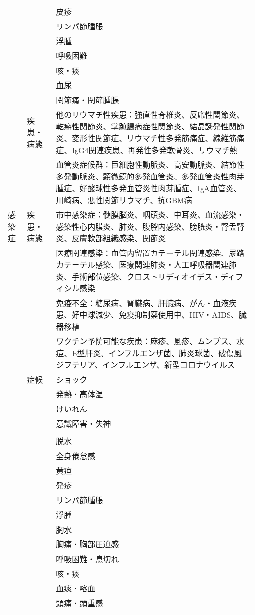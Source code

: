 \begin{xltabular}{\linewidth}{XXX}
 &  & 皮疹 \\
 &  & リンパ節腫脹 \\
 &  & 浮腫 \\
 &  & 呼吸困難 \\
 &  & 咳・痰 \\
 &  & 血尿 \\
 &  & 関節痛・関節腫脹 \\
 & 疾患・病態 & 他のリウマチ性疾患：強直性脊椎炎、反応性関節炎、乾癬性関節炎、掌蹠膿疱症性関節炎、結晶誘発性関節炎、変形性関節症、リウマチ性多発筋痛症、線維筋痛症、IgG4関連疾患、再発性多発軟骨炎、リウマチ熱 \\
 &  & 血管炎症候群：巨細胞性動脈炎、高安動脈炎、結節性多発動脈炎、顕微鏡的多発血管炎、多発血管炎性肉芽腫症、好酸球性多発血管炎性肉芽腫症、IgA血管炎、川崎病、悪性関節リウマチ、抗GBM病 \\
感染症 & 疾患・病態 & 市中感染症：髄膜脳炎、咽頭炎、中耳炎、血流感染・感染性心内膜炎、肺炎、腹腔内感染、膀胱炎・腎盂腎炎、皮膚軟部組織感染、関節炎 \\
 &  & 医療関連感染：血管内留置カテーテル関連感染、尿路カテーテル感染、医療関連肺炎・人工呼吸器関連肺炎、手術部位感染、クロストリディオイデス・ディフィシル感染 \\
 &  & 免疫不全：糖尿病、腎臓病、肝臓病、がん・血液疾患、好中球減少、免疫抑制薬使用中、HIV・AIDS、臓器移植 \\
 &  & ワクチン予防可能な疾患：麻疹、風疹、ムンプス、水痘、B型肝炎、インフルエンザ菌、肺炎球菌、破傷風ジフテリア、インフルエンザ、新型コロナウイルス \\
 & 症候 & ショック \\
 &  & 発熱・高体温 \\
 &  & けいれん \\
 &  & 意識障害・失神 \\
 &  &  \\
 &  & 脱水 \\
 &  & 全身倦怠感 \\
 &  & 黄疸 \\
 &  & 発疹 \\
 &  & リンパ節腫脹 \\
 &  & 浮腫 \\
 &  & 胸水 \\
 &  & 胸痛・胸部圧迫感 \\
 &  & 呼吸困難・息切れ \\
 &  & 咳・痰 \\
 &  & 血痰・喀血 \\
 &  & 頭痛・頭重感 \\

\end{xltabular}
